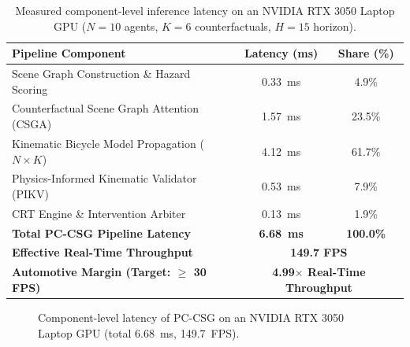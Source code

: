 \documentclass[preprint,12pt]{elsarticle}
\begin{document}
\begin{table}[H]
\caption{Measured component-level inference latency on an NVIDIA RTX 3050 Laptop GPU ($N=10$ agents, $K=6$ counterfactuals, $H=15$ horizon).}
\centering
\label{table_latency}
\begin{tabular}{l|c|c}
\hline
\textbf{Pipeline Component} & \textbf{Latency (ms)} & \textbf{Share (\%)} \\
\hline
Scene Graph Construction \& Hazard Scoring & 0.33~ms & 4.9\% \\
Counterfactual Scene Graph Attention (CSGA) & 1.57~ms & 23.5\% \\
Kinematic Bicycle Model Propagation ($N \times K$) & 4.12~ms & 61.7\% \\
Physics-Informed Kinematic Validator (PIKV) & 0.53~ms & 7.9\% \\
CRT Engine \& Intervention Arbiter & 0.13~ms & 1.9\% \\
\hline
\textbf{Total PC-CSG Pipeline Latency} & \textbf{6.68~ms} & \textbf{100.0\%} \\
\textbf{Effective Real-Time Throughput} & \multicolumn{2}{c}{\textbf{149.7 FPS}} \\
\textbf{Automotive Margin (Target: $\ge$ 30 FPS)} & \multicolumn{2}{c}{\textbf{4.99$\times$ Real-Time Throughput}} \\
\hline
\end{tabular}
\end{table}

\begin{figure}[H]
\centering
{}
\captionsetup{singlelinecheck = false, format= hang, justification=justified, font=footnotesize, labelsep=space}
\caption{Component-level latency of PC-CSG on an NVIDIA RTX 3050 Laptop GPU (total 6.68~ms, 149.7~FPS).}
\label{fig_latency}
\end{figure}
\end{document}
